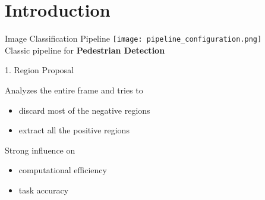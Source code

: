 \section{Introduction}

\begin{frame}[plain]
\end{frame}

\begin{frame}{Image Classification Pipeline}
\centering
\texttt{[image: pipeline\_configuration.png]}\\
\small
Classic pipeline for \textbf{Pedestrian Detection}
\end{frame}

\begin{frame}{1. Region Proposal}

Analyzes the entire frame and tries to
\begin{itemize}
  \item discard most of the negative regions
  \item extract all the positive regions
\end{itemize}
\vspace{1mm}
Strong influence on
\begin{itemize}
  \item computational efficiency
  \item task accuracy
\end{itemize}
\end{frame}

